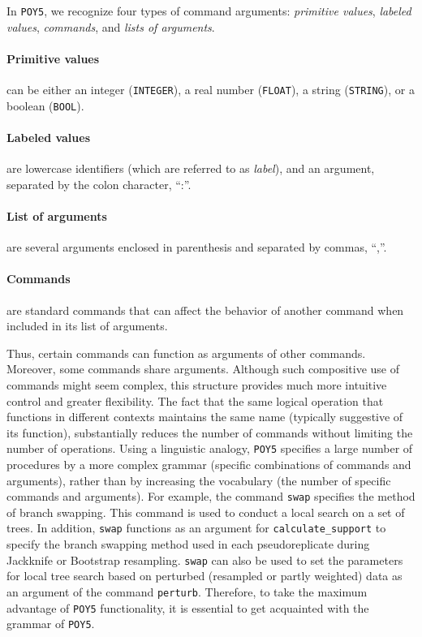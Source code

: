\documentclass[11pt]{book}
\newcommand{\commandstyle}[1]{\texttt{#1}}
\newcommand{\poycommand}[1]{\commandstyle{#1}}
\newcommand{\poystring}{\commandstyle{STRING}\xspace}
\newcommand{\poyfloat}{\commandstyle{FLOAT}\xspace}
\newcommand{\poyint}{\commandstyle{INTEGER}\xspace}
\newcommand{\poybool}{\commandstyle{BOOL}\xspace}
\newcommand{\poy}{\commandstyle{POY5}\xspace}
\begin{document}
In \poy, we recognize four types of command arguments: \emph{primitive values},
\emph{labeled values}, \emph{commands}, and \emph{lists of arguments}.

\paragraph{Primitive values} can be either an integer (\poyint), a real number
(\poyfloat), a string (\poystring), or a boolean (\poybool).

\paragraph{Labeled values} are lowercase identifiers (which are referred to as
\emph{label}), and an argument, separated by the colon character, ``:''.

\paragraph{List of arguments} are several arguments enclosed in parenthesis and
separated by commas, ``,''.

\paragraph{Commands} are standard commands that can affect the behavior of
another command when included in its list of arguments.

Thus, certain commands can function as arguments of other commands. Moreover,
some commands share arguments. Although such compositive use of commands
might seem complex, this structure provides much more intuitive
control and greater flexibility. The fact that the same logical operation that functions
in different contexts maintains
the same name (typically suggestive of its function), substantially reduces the number of
commands without limiting the number of operations. Using a linguistic analogy,
\poy specifies a large number of procedures by a more complex grammar (specific
combinations of commands and arguments), rather than by increasing the vocabulary
(the number of specific commands and arguments). For example, the command
\poycommand{swap} specifies the method of branch swapping. This command is
used to conduct a local search on a set of trees. In addition,
\poycommand{swap} functions as an argument for \poycommand{calculate\_support}
to specify the branch swapping method used in each pseudoreplicate during Jackknife or
Bootstrap resampling. \poycommand{swap} can also be used to set the parameters for
local tree search based on perturbed (resampled or partly weighted) data as an argument
of the command \poycommand{perturb}. Therefore, to take the maximum advantage of
\poy functionality, it is essential to get acquainted with the grammar of  \poy.
\end{document}
